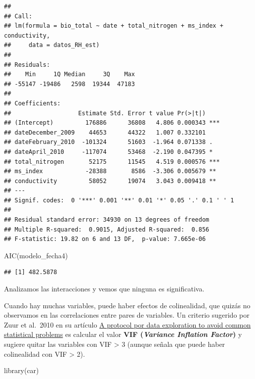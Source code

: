\documentclass[
]{book}
\newenvironment{Shaded}{\begin{snugshade}}{\end{snugshade}}
\newcommand{\FunctionTok}[1]{\textcolor[rgb]{0.00,0.00,0.00}{#1}}
\newcommand{\NormalTok}[1]{#1}
\begin{document}
\begin{verbatim}
## 
## Call:
## lm(formula = bio_total ~ date + total_nitrogen + ms_index + conductivity, 
##     data = datos_RH_est)
## 
## Residuals:
##    Min     1Q Median     3Q    Max 
## -55147 -19486   2598  19344  47183 
## 
## Coefficients:
##                   Estimate Std. Error t value Pr(>|t|)    
## (Intercept)         176886      36808   4.806 0.000343 ***
## dateDecember_2009    44653      44322   1.007 0.332101    
## dateFebruary_2010  -101324      51603  -1.964 0.071338 .  
## dateApril_2010     -117074      53468  -2.190 0.047395 *  
## total_nitrogen       52175      11545   4.519 0.000576 ***
## ms_index            -28388       8586  -3.306 0.005679 ** 
## conductivity         58052      19074   3.043 0.009418 ** 
## ---
## Signif. codes:  0 '***' 0.001 '**' 0.01 '*' 0.05 '.' 0.1 ' ' 1
## 
## Residual standard error: 34930 on 13 degrees of freedom
## Multiple R-squared:  0.9015, Adjusted R-squared:  0.856 
## F-statistic: 19.82 on 6 and 13 DF,  p-value: 7.665e-06
\end{verbatim}

\begin{Shaded}
\begin{Highlighting}[]
\FunctionTok{AIC}\NormalTok{(modelo\_fecha4)}
\end{Highlighting}
\end{Shaded}

\begin{verbatim}
## [1] 482.5878
\end{verbatim}

Analizamos las interacciones y vemos que ninguna es significativa.

Cuando hay muchas variables, puede haber efectos de colinealidad, que quizás no observamos en las correlaciones entre pares de variables. Un criterio sugerido por Zuur et al.~2010 en su artículo \href{https://besjournals.onlinelibrary.wiley.com/doi/10.1111/j.2041-210X.2009.00001.x}{A protocol por data exploration to avoid common statistical problems} es calcular el valor \textbf{VIF (\emph{Variance Inflation Factor})} y sugiere quitar las variables con VIF \textgreater{} 3 (aunque señala que puede haber colinealidad con VIF \textgreater{} 2).

\begin{Shaded}
\begin{Highlighting}[]
\FunctionTok{library}\NormalTok{(car)}
\end{Highlighting}
\end{Shaded}
\end{document}
